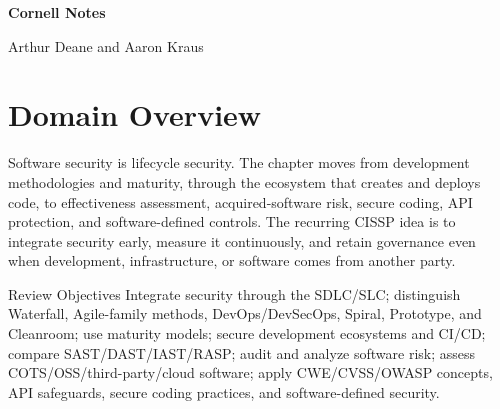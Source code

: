 \documentclass[10pt,letterpaper]{article}
\begin{document}
\hypersetup{pageanchor=false}
\begin{titlepage}\pagecolor{navy}\color{white}\vspace{0.25in}{\large Sixth Edition \textbullet\ 2021\par}\vfill{\Huge\bfseries Cornell Notes\par}\vspace{0.25in}{\LARGE Domain 8\par}\vspace{0.08in}{\LARGE\bfseries Software Development Security\par}\vfill{\large Arthur Deane and Aaron Kraus\par}\vspace{0.12in}{\normalsize Study and review companion\par}\end{titlepage}
\hypersetup{pageanchor=true}\nopagecolor\color{black}

\section*{\color{navy}Domain Overview}
Software security is lifecycle security. The chapter moves from development methodologies and maturity, through the ecosystem that creates and deploys code, to effectiveness assessment, acquired-software risk, secure coding, API protection, and software-defined controls. The recurring CISSP idea is to integrate security early, measure it continuously, and retain governance even when development, infrastructure, or software comes from another party.

\begin{summarybox}{Review Objectives}
Integrate security through the SDLC/SLC; distinguish Waterfall, Agile-family methods, DevOps/DevSecOps, Spiral, Prototype, and Cleanroom; use maturity models; secure development ecosystems and CI/CD; compare SAST/DAST/IAST/RASP; audit and analyze software risk; assess COTS/OSS/third-party/cloud software; apply CWE/CVSS/OWASP concepts, API safeguards, secure coding practices, and software-defined security.
\end{summarybox}
\end{document}
